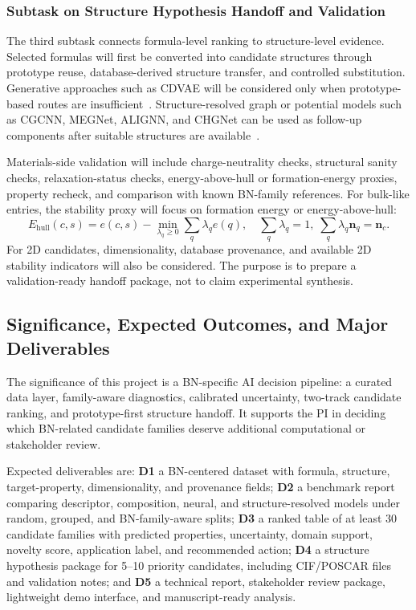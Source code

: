 \documentclass[10pt,a4paper]{article}
\newcommand{\ehull}{E_{\mathrm{hull}}}
\begin{document}
\subsubsection{Subtask on Structure Hypothesis Handoff and Validation}
The third subtask connects formula-level ranking to structure-level evidence. Selected formulas will first be converted into candidate structures through prototype reuse, database-derived structure transfer, and controlled substitution. Generative approaches such as CDVAE will be considered only when prototype-based routes are insufficient~\cite{xie2022_cdvae}. Structure-resolved graph or potential models such as CGCNN, MEGNet, ALIGNN, and CHGNet can be used as follow-up components after suitable structures are available~\cite{xie2018_cgcnn,chen2019_megnet,choudhary2021_alignn,deng2023_chgnet}.

Materials-side validation will include charge-neutrality checks, structural sanity checks, relaxation-status checks, energy-above-hull or formation-energy proxies, property recheck, and comparison with known BN-family references. For bulk-like entries, the stability proxy will focus on formation energy or energy-above-hull:
\[
  \ehull(c,s)=e(c,s)-
  \min_{\lambda_q\ge0}\sum_q\lambda_q e(q),
  \quad \sum_q\lambda_q=1,\;\sum_q\lambda_q\mathbf{n}_q=\mathbf{n}_c.
\]
For 2D candidates, dimensionality, database provenance, and available 2D stability indicators will also be considered. The purpose is to prepare a validation-ready handoff package, not to claim experimental synthesis.

\subsection{Significance, Expected Outcomes, and Major Deliverables}
The significance of this project is a BN-specific AI decision pipeline: a curated data layer, family-aware diagnostics, calibrated uncertainty, two-track candidate ranking, and prototype-first structure handoff. It supports the PI in deciding which BN-related candidate families deserve additional computational or stakeholder review.

Expected deliverables are: \textbf{D1} a BN-centered dataset with formula, structure, target-property, dimensionality, and provenance fields; \textbf{D2} a benchmark report comparing descriptor, composition, neural, and structure-resolved models under random, grouped, and BN-family-aware splits; \textbf{D3} a ranked table of at least 30 candidate families with predicted properties, uncertainty, domain support, novelty score, application label, and recommended action; \textbf{D4} a structure hypothesis package for 5--10 priority candidates, including CIF/POSCAR files and validation notes; and \textbf{D5} a technical report, stakeholder review package, lightweight demo interface, and manuscript-ready analysis.
\end{document}
